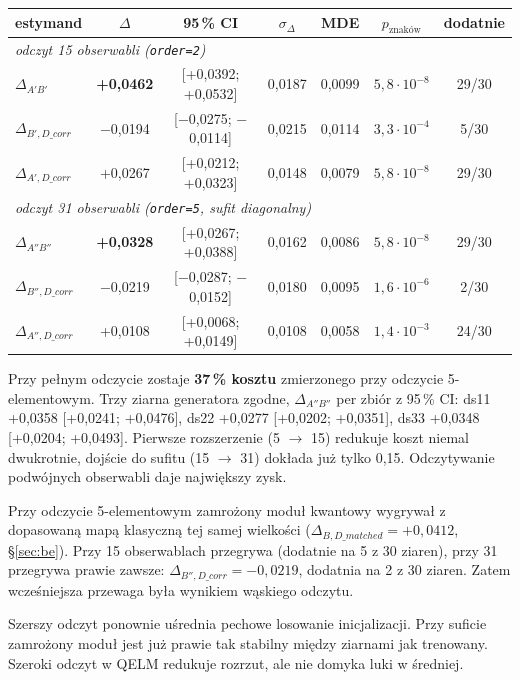 \documentclass[11pt, a4paper]{article}
\begin{document}
\begin{table}[H]
\centering
\renewcommand{\arraystretch}{1.3}
\begin{tabular}{lcccccc}
\toprule
\textbf{estymand} & $\Delta$ & \textbf{95\,\% CI} & $\sigma_\Delta$ & \textbf{MDE} & $p_{\text{znaków}}$ & \textbf{dodatnie} \\
\midrule
\multicolumn{7}{l}{\emph{odczyt 15 obserwabli (\texttt{order=2})}} \\
$\Delta_{A'B'}$ & \textbf{+0,0462} & [+0,0392; +0,0532] & 0,0187 & 0,0099 & $5{,}8\cdot10^{-8}$ & 29/30 \\
$\Delta_{B',D\_corr}$ & $-$0,0194 & [$-$0,0275; $-$0,0114] & 0,0215 & 0,0114 & $3{,}3\cdot10^{-4}$ & 5/30 \\
$\Delta_{A',D\_corr}$ & +0,0267 & [+0,0212; +0,0323] & 0,0148 & 0,0079 & $5{,}8\cdot10^{-8}$ & 29/30 \\
\midrule
\multicolumn{7}{l}{\emph{odczyt 31 obserwabli (\texttt{order=5}, sufit diagonalny)}} \\
$\Delta_{A''B''}$ & \textbf{+0,0328} & [+0,0267; +0,0388] & 0,0162 & 0,0086 & $5{,}8\cdot10^{-8}$ & 29/30 \\
$\Delta_{B'',D\_corr}$ & $-$0,0219 & [$-$0,0287; $-$0,0152] & 0,0180 & 0,0095 & $1{,}6\cdot10^{-6}$ & 2/30 \\
$\Delta_{A'',D\_corr}$ & +0,0108 & [+0,0068; +0,0149] & 0,0108 & 0,0058 & $1{,}4\cdot10^{-3}$ & 24/30 \\
\bottomrule
\end{tabular}
\end{table}

Przy pełnym odczycie zostaje \textbf{37\,\% kosztu} zmierzonego przy odczycie 5-elementowym. Trzy ziarna generatora zgodne, $\Delta_{A''B''}$ per zbiór z 95\,\% CI: ds11 +0,0358 [+0,0241; +0,0476], ds22 +0,0277 [+0,0202; +0,0351], ds33 +0,0348 [+0,0204; +0,0493]. Pierwsze rozszerzenie (5 $\rightarrow$ 15) redukuje koszt niemal dwukrotnie, dojście do sufitu (15 $\rightarrow$ 31) dokłada już tylko 0,15. Odczytywanie podwójnych obserwabli daje największy zysk.

Przy odczycie 5-elementowym zamrożony moduł kwantowy wygrywał z dopasowaną mapą klasyczną tej samej wielkości ($\Delta_{B,D\_matched}=+0{,}0412$, \S\ref{sec:be}). Przy 15 obserwablach przegrywa (dodatnie na 5 z 30 ziaren), przy 31 przegrywa prawie zawsze: $\Delta_{B'',D\_corr}=-0{,}0219$, dodatnia na 2 z 30 ziaren. Zatem wcześniejsza przewaga była wynikiem wąskiego odczytu.

Szerszy odczyt ponownie uśrednia pechowe losowanie inicjalizacji. Przy suficie zamrożony moduł jest już prawie tak stabilny między ziarnami jak trenowany. Szeroki odczyt w QELM redukuje rozrzut, ale nie domyka luki w średniej.
\end{document}
